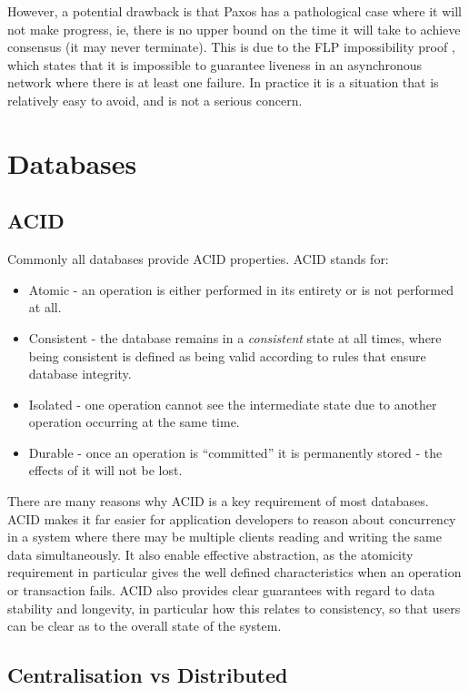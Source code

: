 \documentclass[12pt,twoside,notitlepage]{report}
\begin{document}
However, a potential drawback is that Paxos has a pathological case where it will not make
progress, ie, there is no upper bound on the time it will take to achieve consensus (it may never
terminate). This is due to the FLP impossibility proof \cite{fischer85}, which states that it is
impossible to guarantee liveness in an asynchronous network where there is at least one failure.
In practice it is a situation that is relatively easy to avoid, and is not a serious concern.

\section{Databases}

\subsection*{ACID}

Commonly all databases provide ACID properties. ACID stands for:

\begin{itemize}
\item Atomic - an operation is either performed in its entirety or is not performed at all.
\item Consistent - the database remains in a \emph{consistent} state at all times, where being
	consistent is defined as being valid according to rules that ensure database integrity.
\item Isolated - one operation cannot see the intermediate state due to another operation occurring
	at the same time.
\item Durable - once an operation is ``committed'' it is permanently stored - the effects of it will
	not be lost.
\end{itemize}

There are many reasons why ACID is a key requirement of most databases. ACID makes it far easier
for application developers to reason about concurrency in a system where there may be multiple
clients reading and writing the same data simultaneously. It also enable effective abstraction, as
the atomicity requirement in particular gives the well defined characteristics when an operation
or transaction fails. ACID also provides clear guarantees with regard to data stability and
longevity, in particular how this relates to consistency, so that users can be clear as to the
overall state of the system.

\subsection*{Centralisation vs Distributed}
\end{document}
